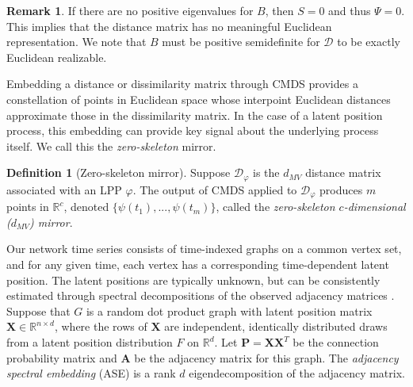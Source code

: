 \documentclass[12pt]{article}
\theoremstyle{definition}
\newtheorem{definition}{Definition}
\newtheorem{remark}{Remark}
\newcommand{\R}{\mathbb{R}}
\newcommand{\bA}{\mathbf{A}}
\newcommand{\bP}{\mathbf{P}}
\newcommand{\bX}{\mathbf{X}}
\begin{document}
\begin{remark}
If there are no positive eigenvalues for \( B \), then \( S=0 \) and thus \( \Psi=0 \). This implies that the distance matrix has no meaningful Euclidean representation. We note that \( B \) must be positive semidefinite for \( \mathcal{D} \) to be exactly Euclidean realizable.
\end{remark}
Embedding a distance or dissimilarity matrix through CMDS provides a constellation of points in Euclidean space whose interpoint Euclidean distances approximate those in the dissimilarity matrix. In the case of a latent position process, this embedding can provide key signal about the underlying process itself. We call this the {\em zero-skeleton} mirror. 
\begin{definition}[Zero-skeleton mirror]\label{def:0-skeleton-dMV-mirror} Suppose $\mathcal{D}_{\varphi}$ is the $d_{MV}$ distance matrix associated with an  LPP $\varphi$. The output of CMDS applied to $\mathcal{D}_{\varphi}$ produces $m$ points in $\R^c$, denoted $\{\psi(t_1),...,\psi(t_m)\}$, called the \emph{zero-skeleton $c$-dimensional ($d_{MV}$) mirror}. 
\end{definition}






Our network time series consists of time-indexed graphs on a common vertex set, and for any given time, each vertex has a corresponding time-dependent latent position. The latent positions are typically unknown, but can be consistently estimated through spectral decompositions of the observed adjacency matrices \cite{STFP-2011}.  Suppose that $G$ is a random dot product graph with latent position matrix $\bX \in \R^{n \times d}$, where the rows of $\bX$ are independent, identically distributed draws from a latent position distribution $F$ on $\mathbb{R}^d$. Let $\bP=\bX \bX^T$ be the connection probability matrix and $\bA$ be the adjacency matrix for this graph. The {\em adjacency spectral embedding} (ASE) is a rank $d$ eigendecomposition of the adjacency matrix.
\end{document}

